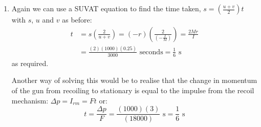 \begin{problem}[A1972AMIIQ2l]
{\begin{enumerate}
	\item Again we can use a SUVAT equation to find the time taken, $s = \left( \frac{u + v}{2} \right)t$ with $s$, $u$ and $v$ as before:
\begin{align*} 
t &= s \left( \frac{2}{u + v} \right) = (-r) \left( \frac{2}{\left( -\frac{I}{M} \right)} \right) = \frac{2Mr}{I} \\ 
&= \frac{(2)(1000)(0.25)}{3000} \text{ seconds} = \frac{1}{6} \text{ s} 
\end{align*} as required.

Another way of solving this would be to realise that the change in momentum of the gun from recoiling to stationary is equal to the impulse from the recoil mechanism: $ \Delta p = I_{rm} = Ft$ or:
\begin{equation*} 
t = \frac{\Delta p}{F} = \frac{(1000)(3)}{(18000)} \text{ s} = \frac{1}{6} \text{ s}
 \end{equation*}

\end{enumerate}}
\end{problem}